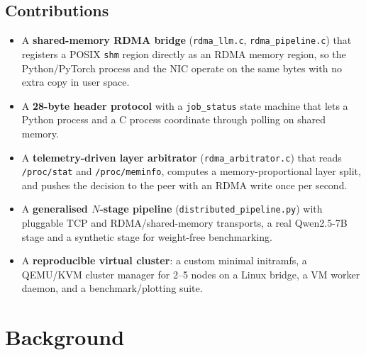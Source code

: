 \documentclass[11pt,a4paper]{article}
\begin{document}
\subsection{Contributions}
\begin{itemize}[leftmargin=*]
  \item A \textbf{shared-memory RDMA bridge} (\texttt{rdma\_llm.c}, \texttt{rdma\_pipeline.c}) that registers a POSIX \texttt{shm} region directly as an RDMA memory region, so the Python/PyTorch process and the NIC operate on the same bytes with no extra copy in user space.
  \item A \textbf{28-byte header protocol} with a \texttt{job\_status} state machine that lets a Python process and a C process coordinate through polling on shared memory.
  \item A \textbf{telemetry-driven layer arbitrator} (\texttt{rdma\_arbitrator.c}) that reads \texttt{/proc/stat} and \texttt{/proc/meminfo}, computes a memory-proportional layer split, and pushes the decision to the peer with an RDMA write once per second.
  \item A \textbf{generalised $N$-stage pipeline} (\texttt{distributed\_pipeline.py}) with pluggable TCP and RDMA/shared-memory transports, a real Qwen2.5-7B stage and a synthetic stage for weight-free benchmarking.
  \item A \textbf{reproducible virtual cluster}: a custom minimal initramfs, a QEMU/KVM cluster manager for 2--5 nodes on a Linux bridge, a VM worker daemon, and a benchmark/plotting suite.
\end{itemize}

\section{Background}
\end{document}
